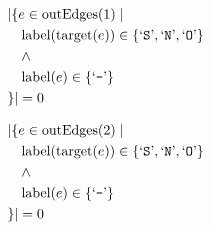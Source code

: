 \begin{align*}
&|\{e \in \mathrm{outEdges}(1)  \mid \\
&\quad \mathrm{label}(\mathrm{target}(e)) \in \{ \text{`\texttt{S}'},  \text{`\texttt{N}'},  \text{`\texttt{O}'} \}\\
&\quad \wedge\\
&\quad \mathrm{label}(e) \in \{ \text{`\texttt{-}'} \}\\
&\}| = 0
\end{align*}

\begin{align*}
&|\{e \in \mathrm{outEdges}(2)  \mid \\
&\quad \mathrm{label}(\mathrm{target}(e)) \in \{ \text{`\texttt{S}'},  \text{`\texttt{N}'},  \text{`\texttt{O}'} \}\\
&\quad \wedge\\
&\quad \mathrm{label}(e) \in \{ \text{`\texttt{-}'} \}\\
&\}| = 0
\end{align*}

